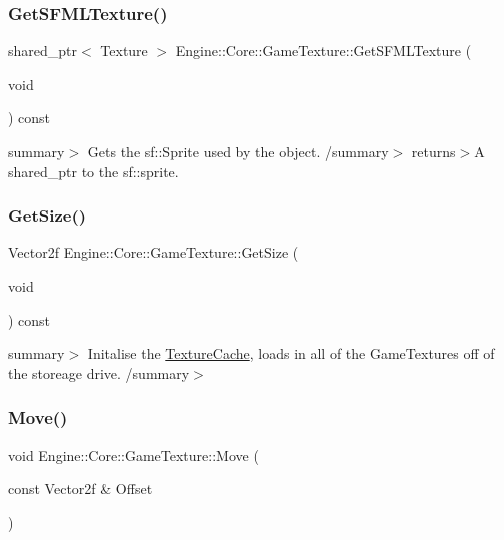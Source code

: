 \subsubsection{\texorpdfstring{Get\+S\+F\+M\+L\+Texture()}{GetSFMLTexture()}}
{\footnotesize\ttfamily shared\+\_\+ptr$<$ Texture $>$ Engine\+::\+Core\+::\+Game\+Texture\+::\+Get\+S\+F\+M\+L\+Texture (\begin{DoxyParamCaption}\item[{void}]{ }\end{DoxyParamCaption}) const}

summary$>$ Gets the sf\+::\+Sprite used by the object. /summary$>$ returns$>$A shared\+\_\+ptr to the sf\+::sprite.\mbox{\label{class_engine_1_1_core_1_1_game_texture_a7ce550b437a2b17b8cf574c6a91b6f60}} 
\subsubsection{\texorpdfstring{Get\+Size()}{GetSize()}}
{\footnotesize\ttfamily Vector2f Engine\+::\+Core\+::\+Game\+Texture\+::\+Get\+Size (\begin{DoxyParamCaption}\item[{void}]{ }\end{DoxyParamCaption}) const}

summary$>$ Initalise the \hyperlink{class_engine_1_1_core_1_1_texture_cache}{Texture\+Cache}, loads in all of the Game\+Textures off of the storeage drive. /summary$>$ \mbox{\label{class_engine_1_1_core_1_1_game_texture_af0169ac026c5b15cb3195d1199b13d33}} 
\subsubsection{\texorpdfstring{Move()}{Move()}}
{\footnotesize\ttfamily void Engine\+::\+Core\+::\+Game\+Texture\+::\+Move (\begin{DoxyParamCaption}\item[{const Vector2f \&}]{Offset }\end{DoxyParamCaption})}

